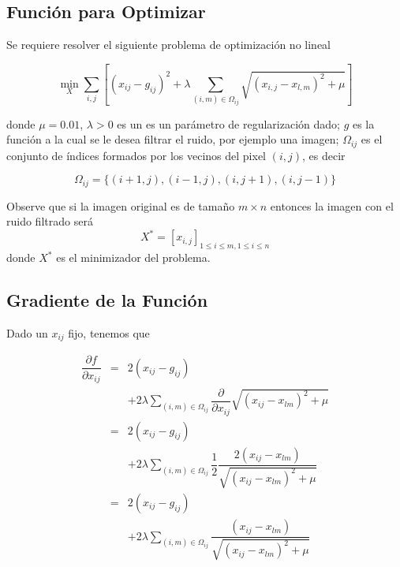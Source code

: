 \documentclass[11pt,letterpaper]{article}
\theoremstyle{definition}
\theoremstyle{definition}
\theoremstyle{definition}
\begin{document}
\subsection{Función para Optimizar}
Se requiere resolver el siguiente problema de optimización no lineal
\begin{shaded*}
	\small{\begin{equation}
		\min_{X} \sum_{i,j} \left[ (x_{ij} - g_{ij})^2 + \lambda \sum_{(i,m)\in\Omega_{ij}} \sqrt{(x_{i,j} - x_{l,m})^2 + \mu} \right]
	\end{equation}}
\end{shaded*}
donde $ \mu = 0.01 $, $ \lambda > 0 $ es un es un parámetro de regularización dado; $ g $ es la
función a la cual se le desea filtrar el ruido, por ejemplo una imagen; $ \Omega_{ij} $ es el conjunto de índices formados por los vecinos del pixel $ (i, j) $, es decir
\begin{shaded*}
	\begin{equation*}
		\Omega_{ij}= \{(i + 1, j), (i - 1, j), (i, j + 1), (i, j - 1)\}
	\end{equation*}
\end{shaded*} 
Observe que si la imagen
original es de tamaño $ m \times n  $ entonces la imagen con el ruido filtrado será 
\[ X^* = \left[ x_{i,j} \right]_{1 \leq i \leq m, 1 \leq i \leq n} \]
donde $ X^* $ es el minimizador del problema.

\subsection{Gradiente de la Función}
Dado un $ x_{ij} $ fijo, tenemos que
\begin{shaded*}
	\begin{eqnarray*}
		\dfrac{\partial f }{\partial x_{ij}} & = & 2 (x_{ij} - g_{ij} )\\
											 &   & + 2 \lambda \sum_{(i,m)\in\Omega_{ij}} \dfrac{\partial}{\partial x_{ij}} \sqrt{(x_{ij} - x_{lm})^2 + \mu} \\
											 & = & 2 (x_{ij} - g_{ij}) \\
											 &   & + 2 \lambda \sum_{(i,m)\in\Omega_{ij}} \dfrac{1}{2} \dfrac{2(x_{ij} - x_{lm})}{\sqrt{(x_{ij} - x_{lm})^2 + \mu}}  \\ 
											 & = & 2 (x_{ij} - g_{ij}) \\
											 &   & + 2 \lambda \sum_{(i,m)\in\Omega_{ij}} \dfrac{(x_{ij} - x_{lm})}{\sqrt{(x_{ij} - x_{lm})^2 + \mu}} 
	\end{eqnarray*}
\end{shaded*}
\end{document}

